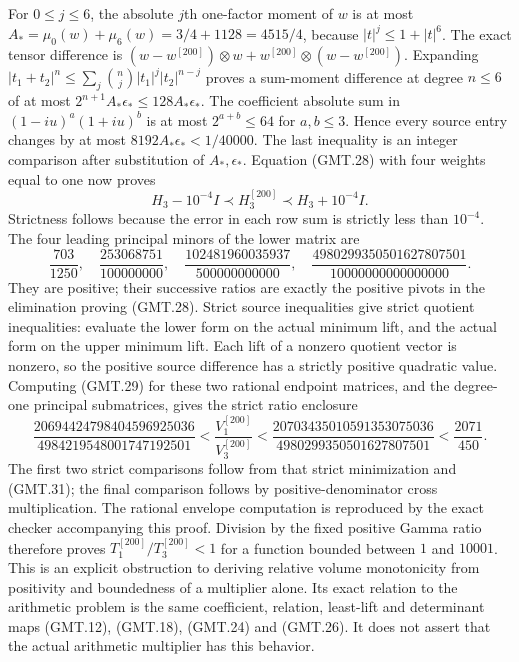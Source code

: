\documentclass[11pt]{article}
\begin{document}
For $0\le j\le6$, the absolute $j$th one-factor moment of $w$
is at most $A_*=\mu_0(w)+\mu_6(w)=3/4+1128=4515/4$,
because $|t|^j\le1+|t|^6$.
The exact tensor difference is
$(w-w^{[200]})\otimes w+w^{[200]}\otimes(w-w^{[200]})$.
Expanding $|t_1+t_2|^n\le\sum_j\binom nj|t_1|^j|t_2|^{n-j}$
proves a sum-moment difference at degree $n\le6$ of at most
$2^{n+1}A_*\epsilon_*\le128A_*\epsilon_*$.
The coefficient absolute sum in $(1-iu)^a(1+iu)^b$ is at most
$2^{a+b}\le64$ for $a,b\le3$. Hence every source entry changes
by at most $8192A_*\epsilon_*<1/40000$. The last inequality is
an integer comparison after substitution of $A_*,\epsilon_*$.
Equation (GMT.28) with four weights equal to one now proves
\[
H_3-10^{-4}I\prec H_3^{[200]}\prec H_3+10^{-4}I.             \tag{GMT.41}
\]
Strictness follows because the error in each row sum is strictly less
than $10^{-4}$. The four leading principal minors of the lower matrix are
\[
 \frac{703}{1250},\quad\frac{253068751}{100000000},\quad
 \frac{102481960035937}{500000000000},\quad
 \frac{4980299350501627807501}{10000000000000000}.
\]
They are positive; their successive ratios are exactly the positive
pivots in the elimination proving (GMT.28). Strict source inequalities
give strict quotient inequalities: evaluate the lower form on the
actual minimum lift, and the actual form on the upper minimum lift.
Each lift of a nonzero quotient vector is nonzero, so the positive
source difference has a strictly positive quadratic value. Computing (GMT.29) for
these two rational endpoint matrices, and the degree-one principal
submatrices, gives the strict ratio enclosure
\[
 \frac{20694424798404596925036}{4984219548001747192501}
 <\frac{V_1^{[200]}}{V_3^{[200]}}
 <\frac{20703435010591353075036}{4980299350501627807501}
 <\frac{2071}{450}.                                          \tag{GMT.42}
\]
The first two strict comparisons follow from that strict minimization
and (GMT.31); the final comparison follows by positive-denominator
cross multiplication. The rational envelope computation is reproduced by the
exact checker accompanying this proof. Division by the fixed positive
Gamma ratio therefore proves
$T_1^{[200]}/T_3^{[200]}<1$ for a function bounded between $1$
and $10001$. This is an explicit obstruction to deriving relative
volume monotonicity from positivity and boundedness of a multiplier
alone. Its exact relation to the arithmetic problem is the same
coefficient, relation, least-lift and determinant maps
(GMT.12), (GMT.18), (GMT.24) and (GMT.26). It does not assert that
the actual arithmetic multiplier has this behavior.
\end{document}
